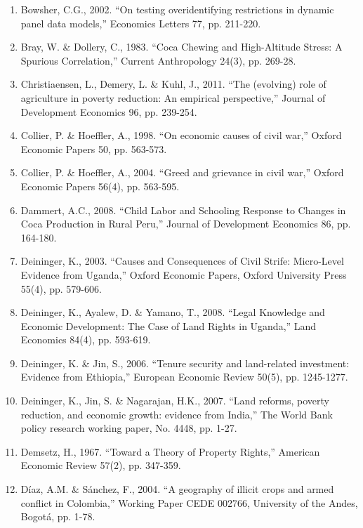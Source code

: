 \begin{enumerate}
\item Bowsher, C.G., 2002. ``On testing overidentifying restrictions in dynamic panel data models,'' Economics Letters 77, pp. 211-220.

\item Bray, W. \& Dollery, C., 1983. ``Coca Chewing and High-Altitude Stress: A Spurious Correlation,'' Current Anthropology 24(3), pp. 269-28.

\item Christiaensen, L., Demery, L. \& Kuhl, J., 2011. ``The (evolving) role of agriculture in poverty reduction: An empirical perspective,'' Journal of Development Economics 96, pp. 239-254.

\item Collier, P. \& Hoeffler, A., 1998. ``On economic causes of civil war,'' Oxford Economic Papers 50, pp. 563-573.

\item Collier, P. \& Hoeffler, A., 2004. ``Greed and grievance in civil war,'' Oxford Economic Papers 56(4), pp. 563-595.

\item Dammert, A.C., 2008. ``Child Labor and Schooling Response to Changes in Coca Production in Rural Peru,'' Journal of Development Economics 86, pp. 164-180.

\item Deininger, K., 2003. ``Causes and Consequences of Civil Strife: Micro-Level Evidence from Uganda,'' Oxford Economic Papers, Oxford University Press 55(4), pp. 579-606.

\item Deininger, K., Ayalew, D. \& Yamano, T., 2008. ``Legal Knowledge and Economic Development: The Case of Land Rights in Uganda,'' Land Economics 84(4), pp. 593-619.

\item Deininger, K. \& Jin, S., 2006. ``Tenure security and land-related investment: Evidence from Ethiopia,'' European Economic Review 50(5), pp. 1245-1277.

\item Deininger, K., Jin, S. \& Nagarajan, H.K., 2007. ``Land reforms, poverty reduction, and economic growth: evidence from India,'' The World Bank policy research working paper, No. 4448, pp. 1-27.

\item Demsetz, H., 1967. ``Toward a Theory of Property Rights,'' American Economic Review 57(2), pp. 347-359.

\item D\'{i}az, A.M. \& S\'{a}nchez, F., 2004. ``A geography of illicit crops and armed conflict in Colombia,'' Working Paper CEDE 002766, University of the Andes, Bogot\'{a}, pp. 1-78.


\end{enumerate}
